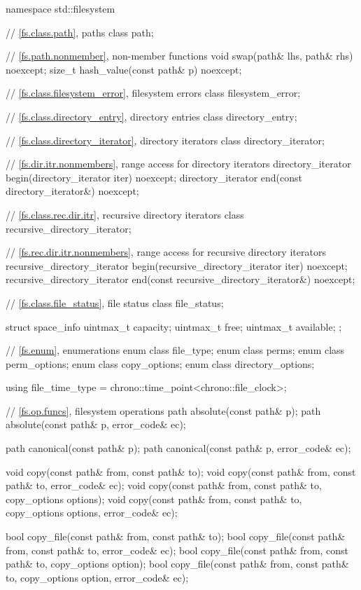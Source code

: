 \begin{codeblock}
namespace std::filesystem {
  // \ref{fs.class.path}, paths
  class path;

  // \ref{fs.path.nonmember},  non-member functions
  void swap(path& lhs, path& rhs) noexcept;
  size_t hash_value(const path& p) noexcept;

  // \ref{fs.class.filesystem_error}, filesystem errors
  class filesystem_error;

  // \ref{fs.class.directory_entry}, directory entries
  class directory_entry;

  // \ref{fs.class.directory_iterator}, directory iterators
  class directory_iterator;

  // \ref{fs.dir.itr.nonmembers}, range access for directory iterators
  directory_iterator begin(directory_iterator iter) noexcept;
  directory_iterator end(const directory_iterator&) noexcept;

  // \ref{fs.class.rec.dir.itr}, recursive directory iterators
  class recursive_directory_iterator;

  // \ref{fs.rec.dir.itr.nonmembers}, range access for recursive directory iterators
  recursive_directory_iterator begin(recursive_directory_iterator iter) noexcept;
  recursive_directory_iterator end(const recursive_directory_iterator&) noexcept;

  // \ref{fs.class.file_status}, file status
  class file_status;

  struct space_info {
    uintmax_t capacity;
    uintmax_t free;
    uintmax_t available;
  };

  // \ref{fs.enum}, enumerations
  enum class file_type;
  enum class perms;
  enum class perm_options;
  enum class copy_options;
  enum class directory_options;

  using file_time_type = chrono::time_point<chrono::file_clock>;

  // \ref{fs.op.funcs}, filesystem operations
  path absolute(const path& p);
  path absolute(const path& p, error_code& ec);

  path canonical(const path& p);
  path canonical(const path& p, error_code& ec);

  void copy(const path& from, const path& to);
  void copy(const path& from, const path& to, error_code& ec);
  void copy(const path& from, const path& to, copy_options options);
  void copy(const path& from, const path& to, copy_options options,
            error_code& ec);

  bool copy_file(const path& from, const path& to);
  bool copy_file(const path& from, const path& to, error_code& ec);
  bool copy_file(const path& from, const path& to, copy_options option);
  bool copy_file(const path& from, const path& to, copy_options option,
                 error_code& ec);

}
\end{codeblock}
